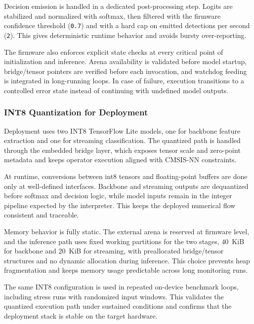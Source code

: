 \documentclass[a4paper,singleside,12pt]{report} %
\begin{document}
	Decision emission is handled in a dedicated post-processing step. Logits are stabilized and normalized with softmax, then filtered with the firmware confidence threshold (\texttt{0.7}) and with a hard cap on emitted detections per second (\texttt{2}). This gives deterministic runtime behavior and avoids bursty over-reporting.

	The firmware also enforces explicit state checks at every critical point of initialization and inference. Arena availability is validated before model startup, bridge/tensor pointers are verified before each invocation, and watchdog feeding is integrated in long-running loops. In case of failure, execution transitions to a controlled error state instead of continuing with undefined model outputs.

\subsubsection{INT8 Quantization for Deployment}
	Deployment uses two INT8 TensorFlow Lite models, one for backbone feature extraction and one for streaming classification. The quantized path is handled through the embedded bridge layer, which exposes tensor scale and zero-point metadata and keeps operator execution aligned with CMSIS-NN constraints.

	At runtime, conversions between int8 tensors and floating-point buffers are done only at well-defined interfaces. Backbone and streaming outputs are dequantized before softmax and decision logic, while model inputs remain in the integer pipeline expected by the interpreter. This keeps the deployed numerical flow consistent and traceable.

		\begin{sloppypar}
		Memory behavior is fully static. The external arena is reserved at firmware level, and the inference path uses fixed working partitions for the two stages, \(40\)~KiB for backbone and \(20\)~KiB for streaming, with preallocated bridge/tensor structures and no dynamic allocation during inference. This choice prevents heap fragmentation and keeps memory usage predictable across long monitoring runs.
		\end{sloppypar}

	The same INT8 configuration is used in repeated on-device benchmark loops, including stress runs with randomized input windows. This validates the quantized execution path under sustained conditions and confirms that the deployment stack is stable on the target hardware.
\end{document}
